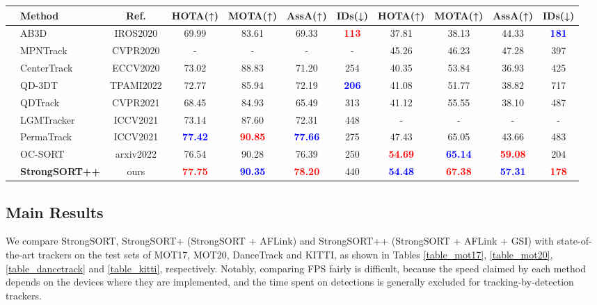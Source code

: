 \documentclass[lettersize,journal]{IEEEtran}
\begin{document}
\begin{table*}
\begin{center}
{\begin{tabular}{cl|c|c|c|c|c|c|c|c|c}
        \hline
        & \textbf{Method} & \textbf{Ref.} & \textbf{HOTA(↑)} & \textbf{MOTA(↑)} & \textbf{AssA(↑)} & \textbf{IDs(↓)} & \textbf{HOTA(↑)} & \textbf{MOTA(↑)} & \textbf{AssA(↑)} & \textbf{IDs(↓)} \\
        \hline
        & AB3D \cite{weng20203d} & IROS2020 & 69.99 & 83.61 & 69.33 & \textcolor{red}{\textbf{113}} & 37.81 & 38.13 & 44.33 & \textcolor{blue}{\textbf{181}} \\
        & MPNTrack \cite{braso2020learning} & CVPR2020 & - & - & - & - & 45.26 & 46.23 & 47.28 & 397 \\
        & CenterTrack \cite{zhou2020tracking} & ECCV2020 & 73.02 & 88.83 & 71.20 & 254 & 40.35 & 53.84 & 36.93 & 425 \\
        & QD-3DT \cite{hu2022monocular} & TPAMI2022 & 72.77 & 85.94 & 72.19 & \textcolor{blue}{\textbf{206}} & 41.08 & 51.77 & 38.82 & 717 \\
        & QDTrack \cite{pang2021quasi} & CVPR2021 & 68.45 & 84.93 & 65.49 & 313 & 41.12 & 55.55 & 38.10 & 487 \\
        & LGMTracker \cite{wang2021track} & ICCV2021 & 73.14 & 87.60 & 72.31 & 448 & - & - & - & - \\
        & PermaTrack \cite{tokmakov2021learning} & ICCV2021 & \textcolor{blue}{\textbf{77.42}} & \textcolor{red}{\textbf{90.85}} & \textcolor{blue}{\textbf{77.66}} & 275 & 47.43 & 65.05 & 43.66 & 483 \\
        & OC-SORT \cite{cao2022observation} & arxiv2022 & 76.54 & 90.28 & 76.39 & 250 & \textbf{\textcolor{red}{54.69}} & \textcolor{blue}{\textbf{65.14}} & \textcolor{red}{\textbf{59.08}} & 204 \\
        & \textbf{StrongSORT++} & ours & \textcolor{red}{\textbf{77.75}} & \textcolor{blue}{\textbf{90.35}} & \textcolor{red}{\textbf{78.20}} & 440 & \textcolor{blue}{\textbf{54.48}} & \textcolor{red}{\textbf{67.38}} & \textcolor{blue}{\textbf{57.31}} & \textcolor{red}{\textbf{178}} \\
        \bottomrule[1pt]
      \end{tabular}
    }
  \end{center}
\end{table*}

\subsection{Main Results}

We compare StrongSORT, StrongSORT+ (StrongSORT + AFLink) and StrongSORT++ (StrongSORT + AFLink + GSI) with state-of-the-art trackers
on the test sets of MOT17, MOT20, DanceTrack and KITTI,
as shown in Tables \ref{table_mot17}, \ref{table_mot20}, \ref{table_dancetrack} and \ref{table_kitti}, respectively.
Notably, comparing FPS fairly is difficult,
because the speed claimed by each method depends on the devices where they are implemented,
and the time spent on detections is generally excluded for tracking-by-detection trackers.
\end{document}
